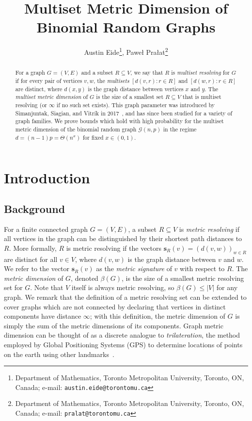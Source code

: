 \documentclass[12pt]{article}
\theoremstyle{definition}
\theoremstyle{remark}
\theoremstyle{remark}
\numberwithin{theorem}{section}
\newcommand{\Gnp}{\mathcal{G}(n,p)}
\begin{document}
\title{Multiset Metric Dimension of Binomial Random Graphs}

\author{
Austin Eide\thanks{Department of Mathematics, Toronto Metropolitan University, Toronto, ON, Canada; e-mail: \texttt{austin.eide@torontomu.ca}}, 
Pawe\l{} Pra\l{}at\thanks{Department of Mathematics, Toronto Metropolitan University, Toronto, ON, Canada; e-mail: \texttt{pralat@torontomu.ca}}
}

\maketitle

\begin{abstract}
For a graph $G = (V,E)$ and a subset $R \subseteq V$, we say that $R$ is \textit{multiset resolving} for $G$ if for every pair of vertices $v,w$, the \textit{multisets} $[d(v,r): r \in R]$ and $[d(w,r):r \in R]$ are distinct, where $d(x,y)$ is the graph distance between vertices $x$ and $y$. The \textit{multiset metric dimension} of $G$ is the size of a smallest set $R \subseteq V$ that is multiset resolving (or $\infty$ if no such set exists). This graph parameter was introduced by Simanjuntak, Siagian, and Vitr\'{i}k in 2017~\cite{simanjuntak2017multiset}, and has since been studied for a variety of graph families. We prove bounds which hold with high probability for the multiset metric dimension of the binomial random graph $\Gnp$ in the regime $d = (n-1)p = \Theta(n^{x})$ for fixed $x \in (0,1)$.
\end{abstract}

\section{Introduction}

\subsection{Background}

For a finite connected graph $G = (V,E)$, a subset $R \subseteq V$ is \textit{metric resolving} if all vertices in the graph can be distinguished by their shortest path distances to $R$. More formally, $R$ is metric resolving if the vectors $\bm{s}_{R}(v) = (d(v,w))_{w \in R}$ are distinct for all $v \in V$, where $d(v,w)$ is the graph distance between $v$ and $w$. We refer to the vector $\bm{s}_{R}(v)$ as the \textit{metric signature} of $v$ with respect to $R$. The \textit{metric dimension} of $G$, denoted $\beta(G)$, is the size of a smallest metric resolving set for $G$. Note that $V$ itself is always metric resolving, so $\beta(G) \leq |V|$ for any graph. We remark that the definition of a metric resolving set can be extended to cover graphs which are not connected by declaring that vertices in distinct components have distance $\infty$; with this definition, the metric dimension of $G$ is simply the sum of the metric dimensions of its components. Graph metric dimension can be thought of as a discrete analogue to \textit{trilateration}, the method employed by Global Positioning Systems (GPS) to determine locations of points on the earth using other landmarks~\cite{tillquist2023getting}.
\end{document}

